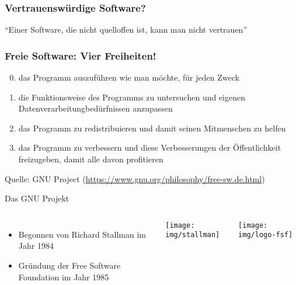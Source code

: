 \begin{frame}
    \frametitle{Vertrauenswürdige Software?}
    \begin{center}\Large
        \enquote{Einer Software, die nicht quelloffen ist, kann man nicht vertrauen}
    \end{center}
\end{frame}

\begin{frame}
	\frametitle{Freie Software: Vier Freiheiten!}

	\begin{enumerate}
		\setcounter{enumi}{-1}
		\item das Programm auszuführen wie man möchte, für jeden Zweck
		\item die Funktionsweise des Programms zu untersuchen und eigenen Datenverarbeitungbedürfnissen anzupassen 
		\item das Programm zu redistribuieren und damit seinen Mitmenschen zu helfen
		\item das Programm zu verbessern und diese Verbesserungen der Öffentlichkeit freizugeben, damit alle davon profitieren
	\end{enumerate}
	
	Quelle: GNU Project (\url{https://www.gnu.org/philosophy/free-sw.de.html})
\end{frame}

\begin{frame}{Das GNU Projekt}
  \begin{columns}
    \column{6cm}

    \begin{itemize}
      \item Begonnen von Richard Stallman im Jahr 1984 
      \item Gründung der Free Software Foundation im Jahr 1985 
    \end{itemize}

    \column{7cm}

    \begin{center}
      \texttt{[image: img/stallman]}
    \par\end{center}

    \begin{center}
      \texttt{[image: img/logo-fsf]}
    \par\end{center}
  \end{columns}
\end{frame}

